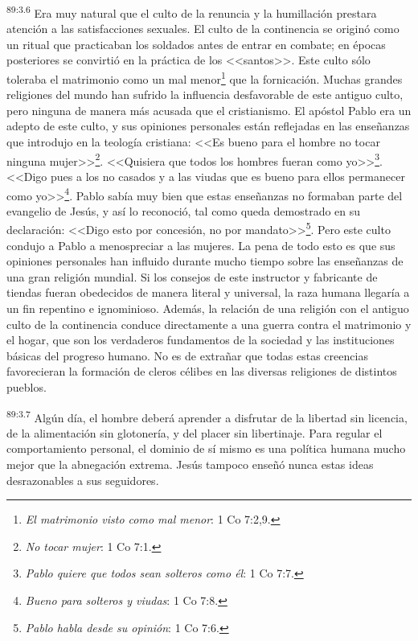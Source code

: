 \documentclass[twoside, 11pt]{book}
\begin{document}
\par
\textsuperscript{89:3.6} Era muy natural que el culto de la renuncia y la humillación prestara atención a las satisfacciones sexuales. El culto de la continencia se originó como un ritual que practicaban los soldados antes de entrar en combate; en épocas posteriores se convirtió en la práctica de los <<santos>>. Este culto sólo toleraba el matrimonio como un mal menor\footnote{\textit{El matrimonio visto como mal menor}: 1 Co 7:2,9.} que la fornicación. Muchas grandes religiones del mundo han sufrido la influencia desfavorable de este antiguo culto, pero ninguna de manera más acusada que el cristianismo. El apóstol Pablo era un adepto de este culto, y sus opiniones personales están reflejadas en las enseñanzas que introdujo en la teología cristiana: <<Es bueno para el hombre no tocar ninguna mujer>>\footnote{\textit{No tocar mujer}: 1 Co 7:1.}. <<Quisiera que todos los hombres fueran como yo>>\footnote{\textit{Pablo quiere que todos sean solteros como él}: 1 Co 7:7.}. <<Digo pues a los no casados y a las viudas que es bueno para ellos permanecer como yo>>\footnote{\textit{Bueno para solteros y viudas}: 1 Co 7:8.}. Pablo sabía muy bien que estas enseñanzas no formaban parte del evangelio de Jesús, y así lo reconoció, tal como queda demostrado en su declaración: <<Digo esto por concesión, no por mandato>>\footnote{\textit{Pablo habla desde su opinión}: 1 Co 7:6.}. Pero este culto condujo a Pablo a menospreciar a las mujeres. La pena de todo esto es que sus opiniones personales han influido durante mucho tiempo sobre las enseñanzas de una gran religión mundial. Si los consejos de este instructor y fabricante de tiendas fueran obedecidos de manera literal y universal, la raza humana llegaría a un fin repentino e ignominioso. Además, la relación de una religión con el antiguo culto de la continencia conduce directamente a una guerra contra el matrimonio y el hogar, que son los verdaderos fundamentos de la sociedad y las instituciones básicas del progreso humano. No es de extrañar que todas estas creencias favorecieran la formación de cleros célibes en las diversas religiones de distintos pueblos.

\par
\textsuperscript{89:3.7} Algún día, el hombre deberá aprender a disfrutar de la libertad sin licencia, de la alimentación sin glotonería, y del placer sin libertinaje. Para regular el comportamiento personal, el dominio de sí mismo es una política humana mucho mejor que la abnegación extrema. Jesús tampoco enseñó nunca estas ideas desrazonables a sus seguidores.
\end{document}

